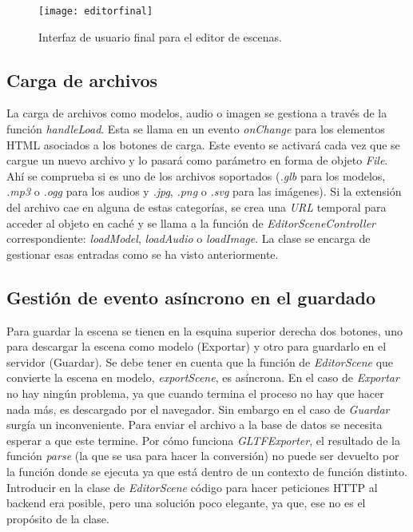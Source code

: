 \begin{figure}[h]
    \centering
    \texttt{[image: editorfinal]}
    \caption[Interfaz de usuario para el editor de escenas]{Interfaz de usuario final para el editor de escenas.}
\end{figure}

\subsection{Carga de archivos}

La carga de archivos como modelos, audio o imagen se gestiona a través de la función \textit{handleLoad}. Esta se llama en un evento \textit{onChange} para los elementos HTML asociados a los botones de carga. Este evento se activará cada vez que se cargue un nuevo archivo y lo pasará como parámetro en forma de objeto \textit{File}. Ahí se comprueba si es uno de los archivos soportados (\textit{.glb} para los modelos, \textit{.mp3} o \textit{.ogg} para los audios y \textit{.jpg}, \textit{.png} o \textit{.svg} para las imágenes). Si la extensión del archivo cae en alguna de estas categorías, se crea una \textit{URL} temporal para acceder al objeto en caché y se llama a la función de \textit{EditorSceneController} correspondiente: \textit{loadModel}, \textit{loadAudio} o \textit{loadImage}. La clase se encarga de gestionar esas entradas como se ha visto anteriormente.

\subsection{Gestión de evento asíncrono en el guardado}

Para guardar la escena se tienen en la esquina superior derecha dos botones, uno para descargar la escena como modelo (Exportar) y otro para guardarlo en el servidor (Guardar). Se debe tener en cuenta que la función de \textit{EditorScene} que convierte la escena en modelo, \textit{exportScene}, es asíncrona. En el caso de \textit{Exportar} no hay ningún problema, ya que cuando termina el proceso no hay que hacer nada más, es descargado por el navegador. Sin embargo en el caso de \textit{Guardar} surgía un inconveniente. Para enviar el archivo a la base de datos se necesita esperar a que este termine. Por cómo funciona \textit{GLTFExporter}, el resultado de la función \textit{parse} (la que se usa para hacer la conversión) no puede ser devuelto por la función donde se ejecuta ya que está dentro de un contexto de función distinto. Introducir en la clase de \textit{EditorScene} código para hacer peticiones HTTP al backend era posible, pero una solución poco elegante, ya que, ese no es el propósito de la clase.

